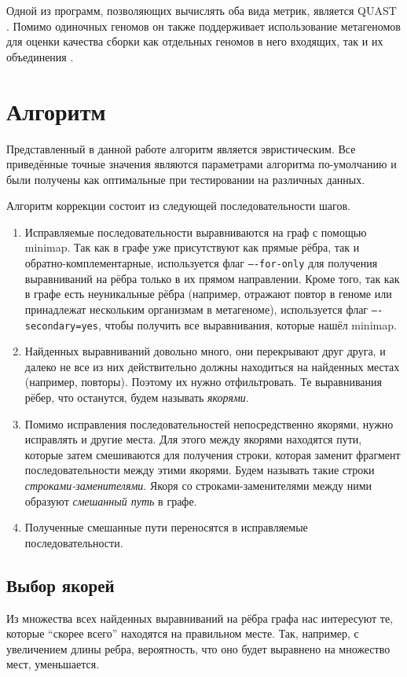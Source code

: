 \documentclass[14pt]{matmex-diploma-custom}
\begin{document}
Одной из программ, позволяющих вычислять оба вида метрик, является QUAST \cite{art:QUAST}. Помимо одиночных геномов он также поддерживает использование  метагеномов для оценки качества сборки как отдельных геномов в него входящих, так и их объединения \cite{art:metaquast}.

\section{Алгоритм}

Представленный в данной работе алгоритм является эвристическим. Все приведённые точные значения являются параметрами алгоритма по-умолчанию и были получены как оптимальные при тестировании на различных данных.

Алгоритм коррекции состоит из следующей последовательности шагов.
\begin{enumerate}
    \item Исправляемые последовательности выравниваются на граф с помощью minimap. Так как в графе уже присутствуют как прямые рёбра, так и обратно-комплементарные, используется флаг \texttt{----for-only} для получения выравниваний на рёбра только в их прямом направлении. Кроме того, так как в графе есть неуникальные рёбра (например, отражают повтор в геноме или принадлежат нескольким организмам в метагеноме), используется флаг \texttt{----secondary=yes}, чтобы получить все выравнивания, которые нашёл minimap.
    \item Найденных выравниваний довольно много, они перекрывают друг друга, и далеко не все из них действительно должны находиться на найденных местах (например, повторы). Поэтому их нужно отфильтровать. Те выравнивания рёбер, что останутся, будем называть \textit{якорями}.
    \item Помимо исправления последовательностей непосредственно якорями, нужно исправлять и другие места. Для этого между якорями находятся пути, которые затем смешиваются для получения строки, которая заменит фрагмент последовательности между этими якорями. Будем называть такие строки \textit{строками-заменителями}. Якоря со строками-заменителями между ними образуют \textit{смешанный путь} в графе.
    \item Полученные смешанные пути переносятся в исправляемые последовательности.
\end{enumerate}

\subsection{Выбор якорей}
Из множества всех найденных выравниваний на рёбра графа нас интересуют те, которые ``скорее всего'' находятся на правильном месте. Так, например, с увеличением длины ребра, вероятность, что оно будет выравнено на множество мест, уменьшается.
\end{document}
